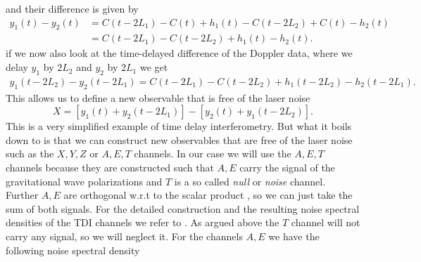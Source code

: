 and their difference is given by
\begin{equation}
    \begin{split}
        y_1(t) - y_2(t) &= C(t - 2L_1) - C(t) + h_1(t) - C(t - 2L_2) + C(t) - h_2(t)\\
        &= C(t - 2L_1) - C(t - 2L_2) + h_1(t) - h_2(t).
    \end{split}
\end{equation}
if we now also look at the time-delayed difference of the Doppler data, where we delay $y_1$ by $2L_2$ and $y_2$ by $2L_1$ we get
\begin{equation}
    \begin{split}
        y_1(t - 2L_2) - y_2(t - 2L_1) = C(t - 2L_1) - C(t - 2L_2) + h_1(t - 2L_2) - h_2(t - 2L_1).
    \end{split}
\end{equation}
This allows us to define a new observable that is free of the laser noise
\begin{equation}
    \boxed{X = \left[ y_1(t) + y_2(t - 2L_1) \right] - \left[y_2(t) +  y_1(t - 2L_2)\right].}
\end{equation}
This is a very simplified example of time delay interferometry. But what it boils down to is that we can construct new observables that are free of the laser noise such as the $X,Y,Z$ or $A,E,T$ channels. In our case we will use the $A,E,T$ channels because they are constructed such that $A,E$ carry the signal of the gravitational wave polarizations and $T$ is a so called \emph{null} or \emph{noise} channel. Further $A,E$ are orthogonal w.r.t to the scalar product , so we can just take the sum of both signals. For the detailed construction and the resulting noise spectral densities of the TDI channels we refer to \cite{Hartwig_2023}. As argued above the $T$ channel will not carry any signal, so we will neglect it. For the channels $A,E$ we have the following noise spectral density

